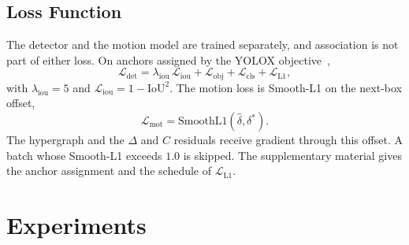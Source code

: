 \documentclass[10pt,twocolumn,letterpaper]{article}
\begin{document}
\subsection{Loss Function}

The detector and the motion model are trained separately, and association is not part of either loss. On anchors assigned by the YOLOX objective~\cite{ge2021yolox},
\begin{equation}
\mathcal{L}_{\mathrm{det}}=\lambda_{\mathrm{iou}}\,\mathcal{L}_{\mathrm{iou}}+\mathcal{L}_{\mathrm{obj}}+\mathcal{L}_{\mathrm{cls}}+\mathcal{L}_{\mathrm{L1}},
\end{equation}
with $\lambda_{\mathrm{iou}}=5$ and $\mathcal{L}_{\mathrm{iou}}=1-\mathrm{IoU}^{2}$. The motion loss is Smooth-L1 on the next-box offset,
\begin{equation}
\mathcal{L}_{\mathrm{mot}}=\mathrm{SmoothL1}(\hat\delta,\delta^{\ast}).
\end{equation}
The hypergraph and the $\Delta$ and $C$ residuals receive gradient through this offset. A batch whose Smooth-L1 exceeds $1.0$ is skipped. The supplementary material gives the anchor assignment and the schedule of $\mathcal{L}_{\mathrm{L1}}$.

\section{Experiments}
\end{document}
